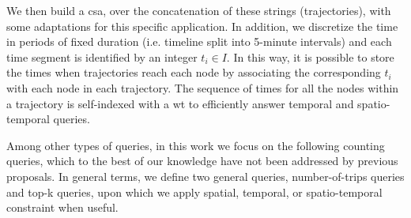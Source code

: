 	We then build a \gls{csa}, over the concatenation of
	these strings (trajectories), with some adaptations for this
	specific application. In addition, we discretize the time in periods of fixed
	duration (i.e. timeline split into 5-minute intervals) and each time
	segment is identified by an integer $t_i \in I$. In this way, it is possible
	to store the times when trajectories reach each node by associating the
	corresponding $t_i$ with each node in each trajectory. The sequence of
	times for all the nodes within a trajectory is self-indexed with a \gls{wt}
	to efficiently answer temporal and spatio-temporal queries.

	Among other types of queries, in this work we focus on the following counting queries, which to the best of our knowledge have not been  addressed by previous proposals. In general terms, we define two general queries, number-of-trips queries and top-k queries, upon which we apply spatial, temporal, or spatio-temporal constraint when useful.

